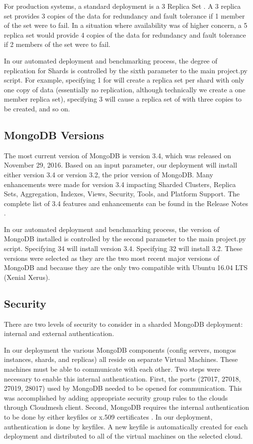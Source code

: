 \documentclass[9pt,twocolumn,twoside]{../../styles/osajnl}
\begin{document}
For production systems, a standard deployment is a 3 Replica Set  \cite{www-mongoRepDep}.  A 3 replica set provides 3 copies of the data for redundancy and fault tolerance if 1 member of the set were to fail.  In a situation where availability was of higher concern, a 5 replica set would provide 4 copies of the data for redundancy and fault tolerance if 2 members of the set were to fail.

In our automated deployment and benchmarking process, the degree of replication for Shards is controlled by the sixth parameter to the main project.py script. For example, specifying 1 for will create a replica set per shard with only one copy of data (essentially no replication, although technically we create a one member replica set), specifying 3 will cause a replica set of with three copies to be created, and so on.

\subsection{MongoDB Versions}

The most current version of MongoDB is version 3.4, which was released on November 29, 2016.  Based on an input parameter, our deployment will install either version 3.4 or version 3.2, the prior version of MongoDB.  Many enhancements were made for version 3.4 impacting Sharded Clusters, Replica Sets, Aggregation, Indexes, Views, Security, Tools, and Platform Support.  The complete list of 3.4 features and enhancements can be found in the Release Notes \cite{www-mongoRelease}.

In our automated deployment and benchmarking process, the version of MongoDB installed is controlled by the second parameter to the main project.py script. Specifying 34 will install version 3.4.  Specifying 32 will install 3.2.  These versions were selected as they are the two most recent major versions of MongoDB and because they are the only two compatible with Ubuntu 16.04 LTS (Xenial Xerus).

\subsection{Security}

There are two levels of security to consider in a sharded MongoDB deployment: internal and external authentication.

In our deployment the various MongoDB components (config servers, mongos instances, shards, and replicas) all reside on separate Virtual Machines.  These machines must be able to communicate with each other.  Two steps were necessary to enable this internal authentication.  First, the ports (27017, 27018, 27019, 28017) used by MongoDB needed to be opened for communication.  This was accomplished by adding appropriate security group rules to the clouds through Cloudmesh client.  Second, MongoDB requires the internal authentication to be done by either keyfiles or x.509 certificates  \cite{www-mongoAuth}.  In our deployment, authentication is done by keyfiles.  A new keyfile is automatically created for each deployment and distributed to all of the virtual machines on the selected cloud.
\end{document}
